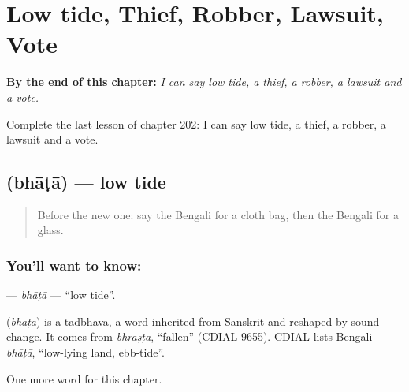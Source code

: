 
\chapter{Low tide, Thief, Robber, Lawsuit, Vote}
\label{ch:bn-low-tide-thief-robber-lawsuit-vote}

\begin{chapteropening}
\textbf{By the end of this chapter:} \emph{I can say low tide, a thief, a robber, a lawsuit and a vote.}

Complete the last lesson of chapter 202: I can say low tide, a thief, a robber, a lawsuit and a vote.
\end{chapteropening}

\section[\texorpdfstring{\bn{ভাটা} (bhāṭā)}{ভাটা (bhāṭā)}]{ (bhāṭā) — low tide}

\label{lesson:BN-C202-bhata}



\begin{quote}
Before the new one: say the Bengali for a cloth bag, then the Bengali for a glass.
\end{quote}

\subsection*{You'll want to know: }
\textbf{} — \emph{bhāṭā} — \textquotedblleft{}low tide\textquotedblright{}.

\begin{cousinweb}
\textbf{} (\emph{bhāṭā}) is a tadbhava, a word inherited from Sanskrit and reshaped by sound change. It comes from \emph{bhraṣṭa}, \textquotedblleft{}fallen\textquotedblright{} (CDIAL 9655). CDIAL lists Bengali \emph{bhāṭā}, \textquotedblleft{}low-lying land, ebb-tide\textquotedblright{}.
\end{cousinweb}

\begin{grammarlens}[title={What you've built}]
One more word for this chapter.
\end{grammarlens}

